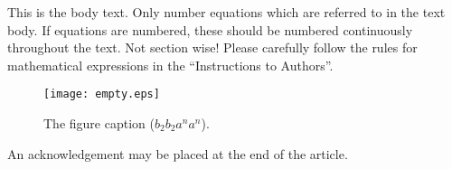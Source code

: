 \documentclass[twoside,a4paper,12pt]{article}
\theoremstyle{plain}
\theoremstyle{definition}
\begin{document}
\noindent This is the body text. Only number equations which are referred to in the text body. If equations
are numbered, these should be numbered continuously throughout the text. Not section wise! Please
carefully follow the rules for mathematical expressions in the ``Instructions to Authors''.

\begin{figure}[htb]
\begin{center}
\texttt{[image: empty.eps]}
\caption{The figure caption ($b_{2}b_{2}a^{n}a^{n}$).}
\end{center}
\end{figure}
\begin{acknowledgement}
An acknowledgement may be placed at the end of the article.
\end{acknowledgement}
\vspace*{1pc}



 \newpage 
 \appendix
 
  
 
% 
% 
% 
\end{document}
